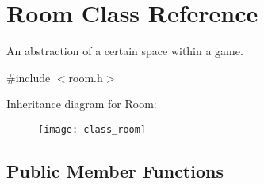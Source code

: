 \hypertarget{class_room}{\section{Room Class Reference}
\label{class_room}
}


An abstraction of a certain space within a game.  




{\ttfamily \#include $<$room.\-h$>$}

Inheritance diagram for Room\-:\begin{figure}[H]
\begin{center}
\leavevmode
\texttt{[image: class\_room]}
\end{center}
\end{figure}
\subsection*{Public Member Functions}
